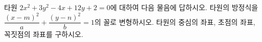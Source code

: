 타원 $2x^2+3y^2-4x+12y+2=0$에 대하여 다음 물음에 답하시오.
 타원의 방정식을 $\dfrac{(x-m)^2}{a}+\dfrac{(y-n)^2}{b}=1$의 꼴로 변형하시오.
 타원의 중심의 좌표, 초점의 좌표, 꼭짓점의 좌표를 구하시오.
